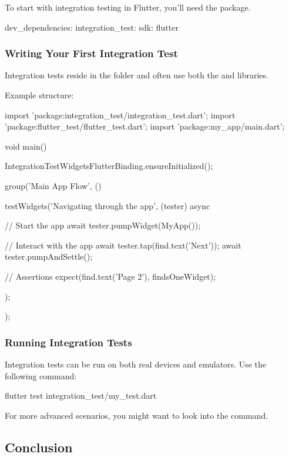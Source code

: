 To start with integration testing in Flutter, you'll need the  package.

\begin{yamlcode}
dev_dependencies:
  integration_test:
    sdk: flutter
\end{yamlcode}

\subsubsection*{Writing Your First Integration Test}

Integration tests reside in the  folder and often use both the  and  libraries.

Example structure:

\begin{dartcode}
import 'package:integration_test/integration_test.dart';
import 'package:flutter_test/flutter_test.dart';
import 'package:my_app/main.dart';

void main() {
  IntegrationTestWidgetsFlutterBinding.ensureInitialized();

  group('Main App Flow', () {
    testWidgets('Navigating through the app', (tester) async {
      // Start the app
      await tester.pumpWidget(MyApp());

      // Interact with the app
      await tester.tap(find.text('Next'));
      await tester.pumpAndSettle();

      // Assertions
      expect(find.text('Page 2'), findsOneWidget);
    });
  });
}
\end{dartcode}

\subsubsection*{Running Integration Tests}

Integration tests can be run on both real devices and emulators. Use the following command:

\begin{bashcode}
flutter test integration_test/my_test.dart
\end{bashcode}

For more advanced scenarios, you might want to look into the  command.

\subsection*{Conclusion}

